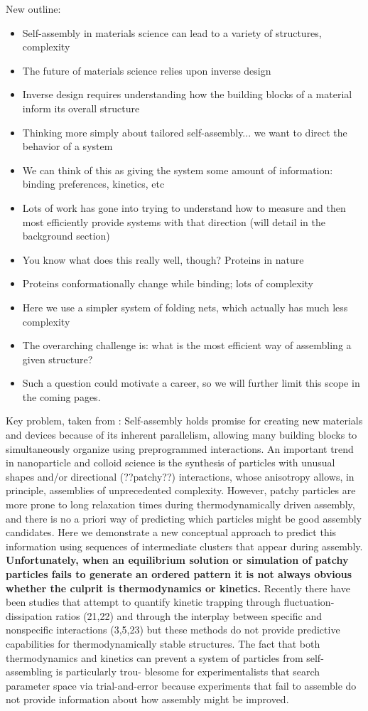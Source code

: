 New outline: 
\begin{itemize}
\item Self-assembly in materials science can lead to a variety of structures, complexity
\item The future of materials science relies upon inverse design
\item Inverse design requires understanding how the building blocks of a material inform its overall structure
\item Thinking more simply about tailored self-assembly... we want to direct the behavior of a system
\item We can think of this as giving the system some amount of information: binding preferences, kinetics, etc
\item Lots of work has gone into trying to understand how to measure and then most efficiently provide systems with that direction (will detail in the background section)
\item You know what does this really well, though? Proteins in nature
\item Proteins conformationally change while binding; lots of complexity
\item Here we use a simpler system of folding nets, which actually has much less complexity
\item The overarching challenge is: what is the most efficient way of assembling a given structure?
\item Such a question could motivate a career, so we will further limit this scope in the coming pages.
\end{itemize}

Key problem, taken from \cite{Jankowski_2012_SoftMatter}:
Self-assembly holds promise for creating new materials and devices because of its inherent parallelism, allowing many building blocks to simultaneously organize using preprogrammed interactions.
An important trend in nanoparticle and colloid science is the synthesis of particles with unusual shapes and/or directional (??patchy??) interactions, whose anisotropy allows, in principle, assemblies of unprecedented complexity.
However, patchy particles are more prone to long relaxation times during thermodynamically driven assembly, and there is no a priori way of predicting which particles might be good assembly candidates. 
Here we demonstrate a new conceptual approach to predict this information using sequences of intermediate clusters that appear during assembly.
\textbf{Unfortunately, when an equilibrium solution or simulation of patchy particles fails to generate an ordered pattern it is not always obvious whether the culprit is thermodynamics or kinetics.}
Recently there have been studies that attempt to quantify kinetic trapping through fluctuation-dissipation ratios (21,22) and through the interplay between specific and nonspecific interactions (3,5,23) but these methods do not provide predictive capabilities for thermodynamically stable structures.
The fact that both thermodynamics and kinetics can prevent a system of particles from self-assembling is particularly trou- blesome for experimentalists that search parameter space via trial-and-error because experiments that fail to assemble do not provide information about how assembly might be improved.

